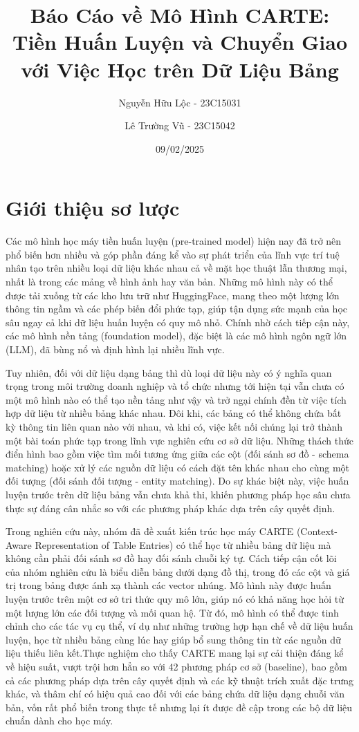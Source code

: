 \documentclass{article}
\title{Báo Cáo về Mô Hình CARTE: Tiền Huấn Luyện và Chuyển Giao với Việc Học trên Dữ Liệu Bảng}
\author{Nguyễn Hữu Lộc - 23C15031 \and Lê Trường Vũ - 23C15042}
\date{09/02/2025}
\begin{document}
\maketitle

\tableofcontents


\section{Giới thiệu sơ lược}
Các mô hình học máy tiền huấn luyện (pre-trained model) hiện nay đã trở nên phổ biến hơn nhiều và góp phần đáng kể vào sự phát triển của lĩnh vực trí tuệ nhân tạo trên nhiều loại dữ liệu khác nhau cả về mặt học thuật lẫn thương mại, nhất là trong các mảng về hình ảnh hay văn bản. Những mô hình này có thể được tải xuống từ các kho lưu trữ như HuggingFace, mang theo một lượng lớn thông tin ngầm và các phép biến đổi phức tạp, giúp tận dụng sức mạnh của học sâu ngay cả khi dữ liệu huấn luyện có quy mô nhỏ. Chính nhờ cách tiếp cận này, các mô hình nền tảng (foundation model), đặc biệt là các mô hình ngôn ngữ lớn (LLM), đã bùng nổ và định hình lại nhiều lĩnh vực.

Tuy nhiên, đối với dữ liệu dạng bảng thì dù loại dữ liệu này có ý nghĩa quan trọng trong môi trường doanh nghiệp và tổ chức nhưng tới hiện tại vẫn chưa có một mô hình nào có thể tạo nền tảng như vậy và trở ngại chính đền từ việc tích hợp dữ liệu từ nhiều bảng khác nhau. Đôi khi, các bảng có thể không chứa bất kỳ thông tin liên quan nào với nhau, và khi có, việc kết nối chúng lại trở thành một bài toán phức tạp trong lĩnh vực nghiên cứu cơ sở dữ liệu. Những thách thức điển hình bao gồm việc tìm mối tương ứng giữa các cột (đối sánh sơ đồ - schema matching) hoặc xử lý các nguồn dữ liệu có cách đặt tên khác nhau cho cùng một đối tượng (đối sánh đối tượng - entity matching). Do sự khác biệt này, việc huấn luyện trước trên dữ liệu bảng vẫn chưa khả thi, khiến phương pháp học sâu chưa thực sự đáng cân nhắc so với các phương pháp khác dựa trên cây quyết định.

Trong nghiên cứu này, nhóm đã đề xuất kiến trúc học máy CARTE (Context-Aware Representation of Table Entries) có thể học từ nhiều bảng dữ liệu mà không cần phải đối sánh sơ đồ hay đối sánh chuỗi ký tự. Cách tiếp cận cốt lõi của nhóm nghiên cứu là biểu diễn bảng dưới dạng đồ thị, trong đó các cột và giá trị trong bảng được ánh xạ thành các vector nhúng. Mô hình này được huấn luyện trước trên một cơ sở tri thức quy mô lớn, giúp nó có khả năng học hỏi từ một lượng lớn các đối tượng và mối quan hệ. Từ đó, mô hình có thể được tinh chỉnh cho các tác vụ cụ thể, ví dụ như những trường hợp hạn chế về dữ liệu huấn luyện, học từ nhiều bảng cùng lúc hay giúp bổ sung thông tin từ các nguồn dữ liệu thiếu liên kết.Thực nghiệm cho thấy CARTE mang lại sự cải thiện đáng kể về hiệu suất, vượt trội hơn hẳn so với 42 phương pháp cơ sở (baseline), bao gồm cả các phương pháp dựa trên cây quyết định và các kỹ thuật trích xuất đặc trưng khác, và thâm chí có hiệu quả cao đối với các bảng chứa dữ liệu dạng chuỗi văn bản, vốn rất phổ biến trong thực tế nhưng lại ít được đề cập trong các bộ dữ liệu chuẩn dành cho học máy.
\end{document}
